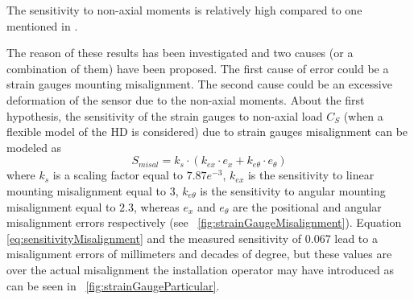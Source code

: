 \documentclass[journal]{IEEEtran}
\begin{document}
The sensitivity to non-axial moments is relatively high compared to one mentioned in \cite{kashiri2017sensor}. %
\par The reason of these results has been investigated and two causes (or a combination of them) have been proposed. The first cause of error could be a strain gauges mounting misalignment. The second cause could be an excessive deformation of the sensor due to the non-axial moments. 
About the first hypothesis, the sensitivity of the strain gauges to non-axial load $C_S$ (when a flexible model of the HD is considered) due to strain gauges misalignment can be modeled as
\begin{equation}
S_{misal}= k_s \cdot (k_{ex} \cdot e_x + k_{e\theta} \cdot e_{\theta})
\label{eq:sensitivityMisalignment}
\end{equation}
where $k_s$ is a scaling factor equal to $7.87e^{-3}$, $k_{ex}$ is the sensitivity to linear mounting misalignment  equal to $3$, $k_{e\theta}$ is the sensitivity to angular mounting misalignment equal to $2.3$, whereas $e_x$ and $e_{\theta}$ are the positional and angular misalignment errors respectively (see \figurename \ \ref{fig:strainGaugeMisalignment}). Equation \eqref{eq:sensitivityMisalignment} and the measured sensitivity of 0.067 lead to a misalignment errors of millimeters and decades of degree, but these values are over the actual misalignment the installation operator may have introduced as can be seen in \figurename \ \ref{fig:strainGaugeParticular}.
%
\end{document}
